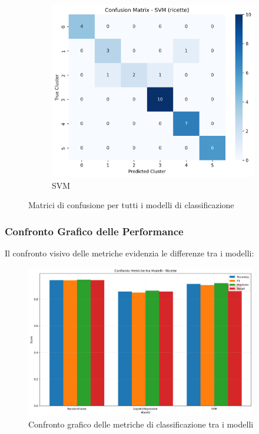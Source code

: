 \documentclass[12pt,a4paper]{article}
\begin{document}
\begin{figure}[H]
\begin{subfigure}{0.32\textwidth}
\end{subfigure}
\hfill
\begin{subfigure}{0.32\textwidth}
    \includegraphics[width=\textwidth]{dati/confusion_matrix_svm_ricette.png}
    \caption{SVM}
\end{subfigure}
\caption{Matrici di confusione per tutti i modelli di classificazione}
\label{fig:confusion_matrices}
\end{figure}

\subsubsection{Confronto Grafico delle Performance}

Il confronto visivo delle metriche evidenzia le differenze tra i modelli:

\begin{figure}[H]
\centering
\includegraphics[width=0.9\textwidth]{dati/model_metrics_comparison_ricette.png}
\caption{Confronto grafico delle metriche di classificazione tra i modelli}
\label{fig:model_metrics_comparison}
\end{figure}
\end{document}
